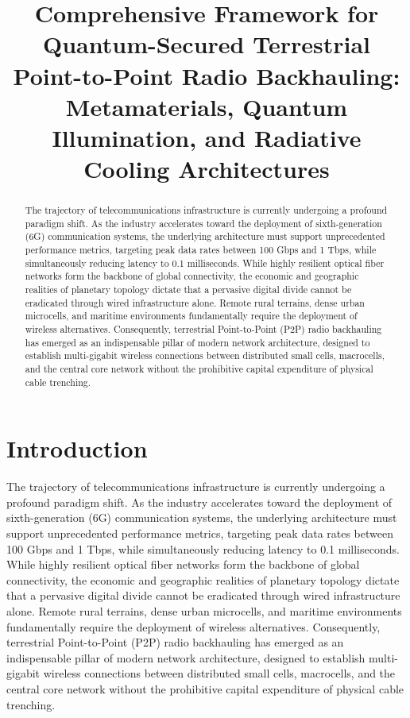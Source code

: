 \documentclass[11pt,a4paper]{article}
\title{Comprehensive Framework for Quantum-Secured Terrestrial Point-to-Point Radio Backhauling: Metamaterials, Quantum Illumination, and Radiative Cooling Architectures}
\author{}
\date{}
\begin{document}
\maketitle

\begin{abstract}
The trajectory of telecommunications infrastructure is currently undergoing a profound paradigm shift. As the industry accelerates toward the deployment of sixth-generation (6G) communication systems, the underlying architecture must support unprecedented performance metrics, targeting peak data rates between 100 Gbps and 1 Tbps, while simultaneously reducing latency to 0.1 milliseconds. While highly resilient optical fiber networks form the backbone of global connectivity, the economic and geographic realities of planetary topology dictate that a pervasive digital divide cannot be eradicated through wired infrastructure alone. Remote rural terrains, dense urban microcells, and maritime environments fundamentally require the deployment of wireless alternatives. Consequently, terrestrial Point-to-Point (P2P) radio backhauling has emerged as an indispensable pillar of modern network architecture, designed to establish multi-gigabit wireless connections between distributed small cells, macrocells, and the central core network without the prohibitive capital expenditure of physical cable trenching.
\end{abstract}

\section{Introduction}

The trajectory of telecommunications infrastructure is currently undergoing a profound paradigm shift. As the industry accelerates toward the deployment of sixth-generation (6G) communication systems, the underlying architecture must support unprecedented performance metrics, targeting peak data rates between 100 Gbps and 1 Tbps, while simultaneously reducing latency to 0.1 milliseconds.\cite{ref1} While highly resilient optical fiber networks form the backbone of global connectivity, the economic and geographic realities of planetary topology dictate that a pervasive digital divide cannot be eradicated through wired infrastructure alone.\cite{ref3} Remote rural terrains, dense urban microcells, and maritime environments fundamentally require the deployment of wireless alternatives.\cite{ref3} Consequently, terrestrial Point-to-Point (P2P) radio backhauling has emerged as an indispensable pillar of modern network architecture, designed to establish multi-gigabit wireless connections between distributed small cells, macrocells, and the central core network without the prohibitive capital expenditure of physical cable trenching.\cite{ref3}
\end{document}
